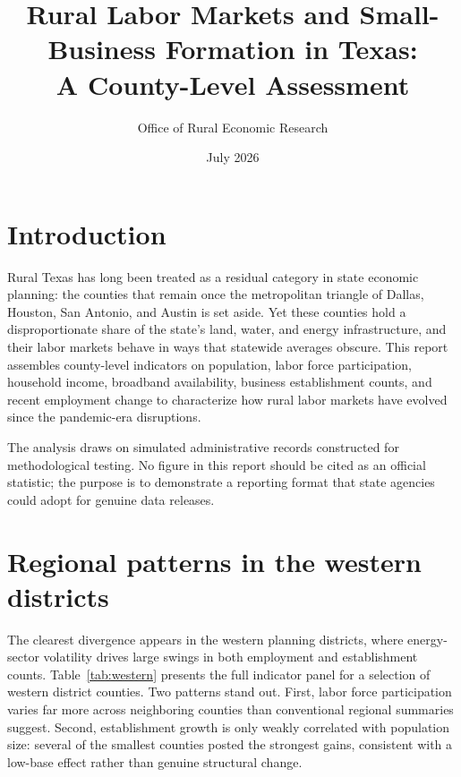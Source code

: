 \documentclass[11pt]{article}
\title{Rural Labor Markets and Small-Business Formation in Texas:\\
A County-Level Assessment}
\author{Office of Rural Economic Research}
\date{July 2026}
\begin{document}
\maketitle

\section{Introduction}

Rural Texas has long been treated as a residual category in state economic
planning: the counties that remain once the metropolitan triangle of Dallas,
Houston, San Antonio, and Austin is set aside. Yet these counties hold a
disproportionate share of the state's land, water, and energy infrastructure,
and their labor markets behave in ways that statewide averages obscure. This
report assembles county-level indicators on population, labor force
participation, household income, broadband availability, business
establishment counts, and recent employment change to characterize how rural
labor markets have evolved since the pandemic-era disruptions.

The analysis draws on simulated administrative records constructed for
methodological testing. No figure in this report should be cited as an
official statistic; the purpose is to demonstrate a reporting format that
state agencies could adopt for genuine data releases.

\section{Regional patterns in the western districts}

The clearest divergence appears in the western planning districts, where
energy-sector volatility drives large swings in both employment and
establishment counts. Table~\ref{tab:western} presents the full indicator
panel for a selection of western district counties. Two patterns stand out.
First, labor force participation varies far more across neighboring counties
than conventional regional summaries suggest. Second, establishment growth is
only weakly correlated with population size: several of the smallest counties
posted the strongest gains, consistent with a low-base effect rather than
genuine structural change.
\end{document}
